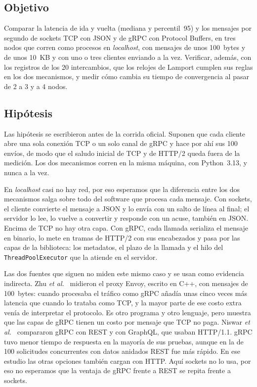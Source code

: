 \subsection{Objetivo}

Comparar la latencia de ida y vuelta (mediana y percentil~95) y los mensajes por segundo de sockets TCP con JSON y de gRPC con Protocol Buffers, en tres nodos que corren como procesos en \emph{localhost}, con mensajes de unos 100~bytes y de unos 10~KB y con uno o tres clientes enviando a la vez. Verificar, además, con los registros de los 20 intercambios, que los relojes de Lamport cumplen sus reglas en los dos mecanismos, y medir cómo cambia su tiempo de convergencia al pasar de 2 a 3 y a 4 nodos.

\subsection{Hipótesis}

Las hipótesis se escribieron antes de la corrida oficial. Suponen que cada cliente abre una sola conexión TCP o un solo canal de gRPC y hace por ahí sus 100 envíos, de modo que el saludo inicial de TCP y de HTTP/2 queda fuera de la medición. Los dos mecanismos corren en la misma máquina, con Python~3.13, y nunca a la vez.

En \emph{localhost} casi no hay red, por eso esperamos que la diferencia entre los dos mecanismos salga sobre todo del software que procesa cada mensaje. Con sockets, el cliente convierte el mensaje a JSON y lo envía con un salto de línea al final; el servidor lo lee, lo vuelve a convertir y responde con un acuse, también en JSON. Encima de TCP no hay otra capa. Con gRPC, cada llamada serializa el mensaje en binario, lo mete en tramas de HTTP/2 con sus encabezados y pasa por las capas de la biblioteca: los metadatos, el plazo de la llamada y el hilo del \texttt{ThreadPoolExecutor} que la atiende en el servidor.

Las dos fuentes que siguen no miden este mismo caso y se usan como evidencia indirecta. Zhu \emph{et al.}~\cite{Zhu2023} midieron el proxy Envoy, escrito en C++, con mensajes de 100~bytes: cuando procesaba el tráfico como gRPC añadía unas cinco veces más latencia que cuando lo trataba como TCP, y la mayor parte de ese costo extra venía de interpretar el protocolo. Es otro programa y otro lenguaje, pero muestra que las capas de gRPC tienen un costo por mensaje que TCP no paga. Niswar \emph{et al.}~\cite{Niswar2024} compararon gRPC con REST y con GraphQL, que usaban HTTP/1.1. gRPC tuvo menor tiempo de respuesta en la mayoría de sus pruebas, aunque en la de 100 solicitudes concurrentes con datos anidados REST fue más rápido. En ese estudio las otras opciones también cargan con HTTP. Aquí sockets no lo usa, por eso no esperamos que la ventaja de gRPC frente a REST se repita frente a sockets.

